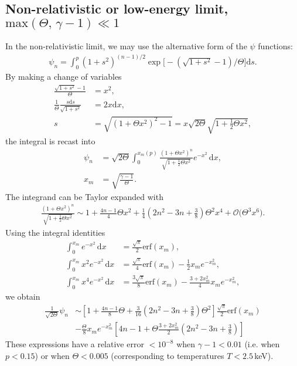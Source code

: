 \documentclass[11pt,a4paper]{article}
\newcommand{\rd}{\ensuremath{\mathrm{d}}}
\newcommand{\Ordo}{\ensuremath{\mathcal{O}}}%
\begin{document}
\subsection{Non-relativistic or low-energy limit, $\mathrm{max}(\Theta,\,\gamma-1)\ll 1$}
In the non-relativistic limit, we may use the alternative form of the $\psi$ functions:
\begin{align}
\psi_n = \int_0^p (1+s^2)^{(n-1)/2} \exp\Big[ - (\sqrt{1+s^2} - 1)/\Theta \Big] \rd s.
\end{align}
By making a change of variables
\begin{align}
\frac{\sqrt{1+s^2}-1}{\Theta} &= x^2 , \nonumber \\
\frac{1}{\Theta}\frac{s\rd s}{\sqrt{1+s^2}} &= 2x\rd x, \nonumber \\ 
s &= \sqrt{ (1+\Theta x^2)^2 - 1} = x\sqrt{2\Theta}\sqrt{1+ \frac{1}{2}\Theta x^2} ,
\end{align}
the integral is recast into
\begin{align}
\psi_n &= \sqrt{2\Theta} \int_0^{x_m(p)} \frac{(1+\Theta x^2)^{n}}{\sqrt{1+\frac{1}{2}\Theta x^2}} e^{-x^2} \, \rd x, \nonumber \\
x_m &= \sqrt{\frac{\gamma-1}{\Theta}}.
\end{align}
The integrand can be Taylor expanded with
\begin{align}
\frac{(1+\Theta x^2)^{n}}{\sqrt{1+\frac{1}{2}\Theta x^2}} \sim 1 + \frac{4n-1}{4}\Theta x^2 + \frac{1}{4}\left(2n^2 - 3n + \frac{3}{8}\right)\Theta^2 x^4 + \Ordo\bigl(\Theta^3 x^6\bigr).
\end{align}
Using the integral identities 
\begin{align}
\int_0^{x_m} e^{-x^2} \,\rd x &= \frac{\sqrt{\pi}}{2}\mathrm{erf}(x_m), \nonumber \\
\int_0^{x_m} x^2e^{-x^2} \,\rd x &= \frac{\sqrt{\pi}}{4}\mathrm{erf}(x_m) - \frac{1}{2} x_m e^{-x_m^2}, \nonumber \\
\int_0^{x_m} x^4e^{-x^2} \,\rd x &= \frac{3\sqrt{\pi}}{8}\mathrm{erf}(x_m) - \frac{3+2x_m^2}{4}x_m e^{-x_m^2},
\end{align}
we obtain
\begin{align}
\frac{1}{\sqrt{2\Theta}}\psi_n &\sim \left[ 1 + \frac{4n-1}{8}\Theta + \frac{3}{16}\left(2n^2- 3n + \frac{3}{8}\right)\Theta^2 \right] \frac{\sqrt{\pi}}{2}\mathrm{erf}(x_m) \nonumber \\
& - \frac{\Theta}{8} x_m e^{-x_m^2} \left[ 4n-1 + \Theta \frac{3+2x_m^2}{2}\left(2n^2-3n+\frac{3}{8}\right)  \right]
\end{align}
These expressions have a relative error $<10^{-8}$ when $\gamma-1 < 0.01$ (i.e. when $p<0.15$) or when $\Theta < 0.005$ (corresponding to temperatures $T < 2.5\,$keV).
\end{document}
